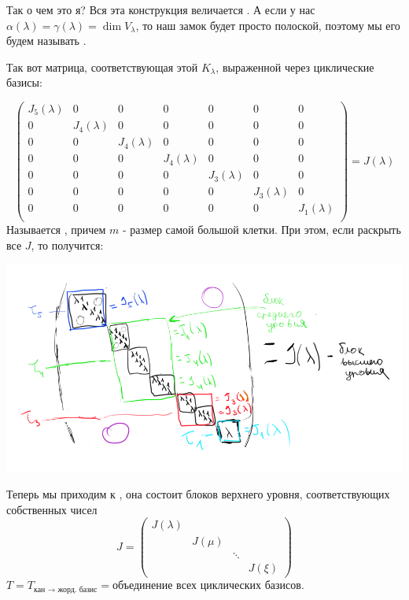Так о чем это я? Вся эта конструкция величается . А если у нас $\alpha(\lambda)=\gamma(\lambda)=\dim V_\lambda$, то наш замок будет просто полоской, поэтому мы его будем называть .

Так вот матрица, соответствующая этой $K_\lambda$, выраженной через циклические базисы:

$$
\begin{pmatrix}
    J_5(\lambda) & 0 & 0 & 0 & 0 & 0 & 0\\
    0 & J_4(\lambda)& 0 & 0 & 0 & 0 & 0\\
   0 & 0 & J_4(\lambda) & 0  & 0 & 0 & 0\\
    0 & 0 & 0 & J_4(\lambda)  & 0 & 0 & 0\\
     0 & 0 & 0 & 0  & J_3(\lambda)& 0 & 0\\
      0 & 0 & 0 & 0  & 0 & J_3(\lambda) & 0\\
     0 & 0 & 0 & 0  & 0 & 0 & J_1(\lambda)\\
\end{pmatrix}=J(\lambda)
$$
Называется , причем $m$ - размер самой большой клетки. При этом, если раскрыть все $J$, то получится: 
\begin{center}
   \includegraphics[width = 20cm]{assets/7_9-zhordan-high-matrix.png}
\end{center}


Теперь мы приходим к , она состоит блоков верхнего уровня, соответствующих собственных чисел
$$J = \begin{pmatrix}
    J(\lambda) & & & \\
    & J(\mu) & & \\
    & & \ddots & \\
    & & &  J(\xi)
\end{pmatrix}$$
$T = T_{\text{кан $\rightarrow$ жорд. базис}} = \text{объединение всех циклических базисов}$. 

